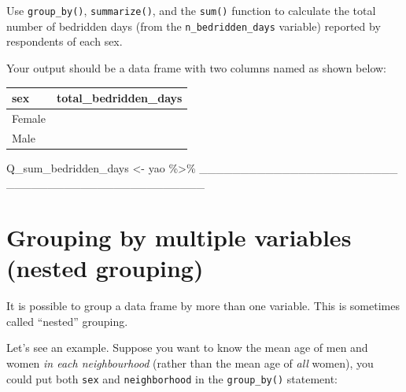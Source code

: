 \documentclass[
  letterpaper,
  DIV=11,
  numbers=noendperiod]{scrreprt}
\newenvironment{Shaded}{\begin{snugshade}}{\end{snugshade}}
\newcommand{\NormalTok}[1]{\textcolor[rgb]{0.00,0.23,0.31}{#1}}
\newcommand{\OtherTok}[1]{\textcolor[rgb]{0.00,0.23,0.31}{#1}}
\newcommand{\SpecialCharTok}[1]{\textcolor[rgb]{0.37,0.37,0.37}{#1}}
\begin{document}
\begin{tcolorbox}[enhanced jigsaw, colframe=quarto-callout-tip-color-frame, rightrule=.15mm, opacityback=0, breakable, coltitle=black, colbacktitle=quarto-callout-tip-color!10!white, bottomrule=.15mm, leftrule=.75mm, toprule=.15mm, arc=.35mm, bottomtitle=1mm, colback=white, left=2mm, opacitybacktitle=0.6, titlerule=0mm, title=\textcolor{quarto-callout-tip-color}{\faLightbulb}\hspace{0.5em}{Practice}, toptitle=1mm]

Use \texttt{group\_by()}, \texttt{summarize()}, and the \texttt{sum()}
function to calculate the total number of bedridden days (from the
\texttt{n\_bedridden\_days} variable) reported by respondents of each
sex.

Your output should be a data frame with two columns named as shown
below:

\begin{longtable}[]{@{}ll@{}}
\toprule\noalign{}
sex & total\_bedridden\_days \\
\midrule\noalign{}
\endhead
\bottomrule\noalign{}
\endlastfoot
Female & \\
Male & \\
\end{longtable}

\begin{Shaded}
\begin{Highlighting}[]
\NormalTok{Q\_sum\_bedridden\_days }\OtherTok{\textless{}{-}} 
\NormalTok{  yao }\SpecialCharTok{\%\textgreater{}\%} 
\NormalTok{  \_\_\_\_\_\_\_\_\_\_\_\_\_\_\_\_\_\_\_\_\_\_\_\_}
\NormalTok{  \_\_\_\_\_\_\_\_\_\_\_\_\_\_\_\_\_\_\_\_\_\_\_\_}
\end{Highlighting}
\end{Shaded}

\end{tcolorbox}

\hypertarget{grouping-by-multiple-variables-nested-grouping}{%
\section{Grouping by multiple variables (nested
grouping)}\label{grouping-by-multiple-variables-nested-grouping}}

It is possible to group a data frame by more than one variable. This is
sometimes called ``nested'' grouping.

Let's see an example. Suppose you want to know the mean age of men and
women \emph{in each neighbourhood} (rather than the mean age of
\emph{all} women), you could put both \texttt{sex} and
\texttt{neighborhood} in the \texttt{group\_by()} statement:
\end{document}
